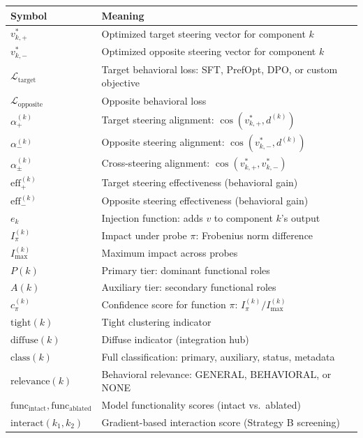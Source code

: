 \documentclass[11pt]{article}
\begin{document}
\begin{center}
\begin{tabular}{ll}
\toprule
\textbf{Symbol} & \textbf{Meaning} \\
\midrule
$v^*_{k,+}$ & Optimized target steering vector for component $k$ \\
$v^*_{k,-}$ & Optimized opposite steering vector for component $k$ \\
$\mathcal{L}_{\text{target}}$ & Target behavioral loss: SFT, PrefOpt, DPO, or custom objective \\
$\mathcal{L}_{\text{opposite}}$ & Opposite behavioral loss \\
$\alpha^{(k)}_+$ & Target steering alignment: $\cos(v^*_{k,+}, d^{(k)})$ \\
$\alpha^{(k)}_-$ & Opposite steering alignment: $\cos(v^*_{k,-}, d^{(k)})$ \\
$\alpha^{(k)}_\pm$ & Cross-steering alignment: $\cos(v^*_{k,+}, v^*_{k,-})$ \\
$\text{eff}^{(k)}_+$ & Target steering effectiveness (behavioral gain) \\
$\text{eff}^{(k)}_-$ & Opposite steering effectiveness (behavioral gain) \\
$e_k$ & Injection function: adds $v$ to component $k$'s output \\
\midrule
$I^{(k)}_\pi$ & Impact under probe $\pi$: Frobenius norm difference \\
$I_{\max}^{(k)}$ & Maximum impact across probes \\
$P(k)$ & Primary tier: dominant functional roles \\
$A(k)$ & Auxiliary tier: secondary functional roles \\
$c^{(k)}_\pi$ & Confidence score for function $\pi$: $I^{(k)}_\pi / I_{\max}^{(k)}$ \\
$\text{tight}(k)$ & Tight clustering indicator \\
$\text{diffuse}(k)$ & Diffuse indicator (integration hub) \\
$\text{class}(k)$ & Full classification: primary, auxiliary, status, metadata \\
$\text{relevance}(k)$ & Behavioral relevance: GENERAL, BEHAVIORAL, or NONE \\
$\text{func}_{\text{intact}}, \text{func}_{\text{ablated}}$ & Model functionality scores (intact vs.\ ablated) \\
\midrule
$\text{interact}(k_1, k_2)$ & Gradient-based interaction score (Strategy B screening) \\

\end{tabular}
\end{center}
\end{document}
